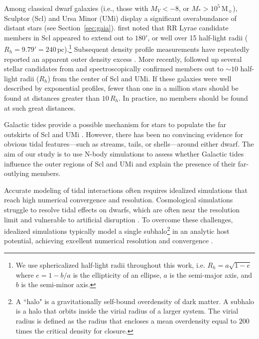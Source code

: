 \documentclass[times,trackchanges, twocolumn, twocolappendix]{aastex701}
\newcommand{\Mo}{\mathrm{M}_\sun}
\begin{document}
Among classical dwarf galaxies (i.e., those with $M_V<-8$, or $M_*>10^5\, \Mo$),  Sculptor (Scl)  and Ursa Minor (UMi) display a significant overabundance of distant stars (see Section~\ref{sec:gaia}). \citet{innanen+papp1979} first noted that RR Lyrae candidate members in Scl appeared to extend out to $180'$, or well over 15 half-light radii ($R_h = 9.79' = 240\,\text{pc}$).\footnote{We use sphericalized half-light radii throughout this work, i.e. $R_h = a \sqrt{1 - e}$ where $e = 1 - b/a$ is the ellipticity of an ellipse, $a$ is the semi-major axis, and $b$ is the semi-minor axis.}
Subsequent density profile measurements have repeatedly reported  an apparent outer density excess \citep{eskridge1988, IH1995,
martinez-delgado+2001, walcher+2003, palma+2003, westfall+2006}. 
More recently, \citet{sestito+2023a, sestito+2023b} followed up several stellar candidates from \cite{jensen+2024} and spectroscopically confirmed members out to ${\sim}10$ half-light radii ($R_h$) from the center of Scl and UMi. If these galaxies were well described by exponential profiles, fewer than one in a million stars should be found at distances greater than $10\,R_h$. In practice, no members should be found at such great distances. 

Galactic tides  provide a possible mechanism for stars to populate the far outskirts of Scl and UMi \citep[e.g.][]{innanen+papp1979, walcher+2003, sestito+2023a}. 
However, there has been no convincing evidence for obvious tidal features---such as streams, tails, or shells---around either dwarf.
The aim of our study is to use N-body simulations to assess whether Galactic tides influence the outer regions of Scl and UMi and explain the presence of their far-outlying members. 

Accurate modeling of tidal interactions often requires idealized simulations that reach high numerical convergence and resolution. Cosmological simulations struggle to resolve tidal effects on dwarfs, which are 
often near the resolution limit and vulnerable to artificial disruption
\citep[e.g.,][]{PNM2008, vandenbosch+2018, EP2020, santos-santos+2025}. To overcome
these challenges, idealized simulations typically model a single subhalo\footnote{A ``halo" is a gravitationally self-bound overdensity of dark matter. A subhalo is a halo that orbits inside the virial radius of a larger system. The virial radius is defined as the radius that encloses a mean overdensity equal to $200$ times the critical density for closure.} in an
analytic host potential, achieving excellent numerical resolution and convergence \citep[e.g.,][]{hayashi+2003, bullock+johnston2005, klimentowski+2009, penarrubia+2010, ogiya+2019, EN2021}. 
\end{document}

